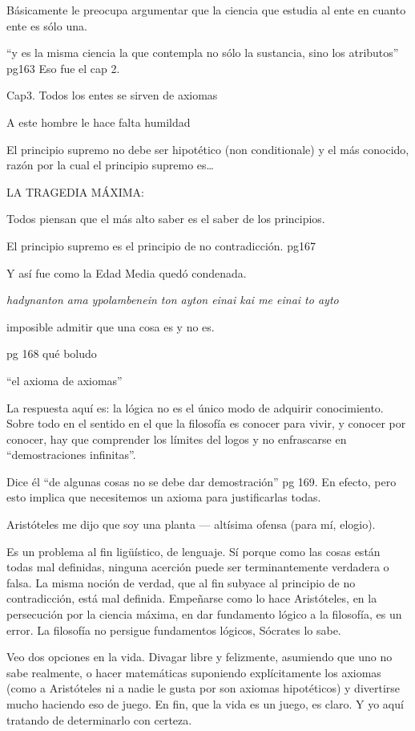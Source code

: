 Básicamente le preocupa argumentar que la
ciencia que estudia al ente en cuanto ente es
sólo una.

``y es la misma ciencia la que contempla no
sólo la sustancia, sino los atributos'' pg163
Eso fue el cap 2.

Cap3. Todos los entes se sirven de axiomas

A este hombre le hace falta humildad

El principio supremo no debe ser hipotético
(non conditionale) y el más conocido, razón
por la cual el principio supremo es\ldots{}

LA TRAGEDIA MÁXIMA:

Todos piensan que el más alto saber es el
saber de los principios.

El principio supremo es el principio de no
contradicción. pg167

Y así fue como la Edad Media quedó condenada.

\emph{hadynanton ama ypolambenein ton ayton
einai kai me einai to ayto}

imposible admitir que una cosa es y no es.

pg 168 qué boludo

``el axioma de axiomas''

La respuesta aquí es: la lógica no es el
único modo de adquirir conocimiento. Sobre
todo en el sentido en el que la filosofía es
conocer para vivir, y conocer por conocer,
hay que comprender los límites del logos y no
enfrascarse en ``demostraciones infinitas''.

Dice él ``de algunas cosas no se debe dar
demostración'' pg 169. En efecto, pero esto
implica que necesitemos un axioma para
justificarlas todas.

Aristóteles me dijo que soy una planta ---
altísima ofensa (para mí, elogio).

Es un problema al fin ligüístico, de
lenguaje. Sí porque como las cosas están
todas mal definidas, ninguna acerción puede
ser terminantemente verdadera o falsa. La
misma noción de verdad, que al fin subyace al
principio de no contradicción, está mal
definida. Empeñarse como lo hace Aristóteles,
en la persecución por la ciencia máxima, en
dar fundamento lógico a la filosofía, es un
error. La filosofía no persigue fundamentos
lógicos, Sócrates lo sabe.

Veo dos opciones en la vida. Divagar libre y
felizmente, asumiendo que uno no sabe
realmente, o hacer matemáticas suponiendo
explícitamente los axiomas (como a
Aristóteles ni a nadie le gusta por son
axiomas hipotéticos) y divertirse mucho
haciendo eso de juego. En fin, que la vida es
un juego, es claro. Y yo aquí tratando de
determinarlo con certeza.

